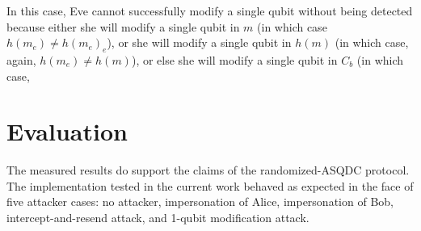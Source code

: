 \documentclass[conference]{IEEEtran}
\begin{document}
In this case, Eve cannot successfully modify a single qubit without
being detected because either she will modify a single qubit in $m$
(in which case $h\left(m_{e}\right)\neq h\left(m_{e}\right)_{e}$),
or she will modify a single qubit in $h\left(m\right)$ (in which
case, again, $h\left(m_{e}\right)\neq h\left(m\right)$), or else
she will modify a single qubit in $C_{b}$ (in which case, 

\section{Evaluation}

The measured results do support the claims of the randomized-ASQDC
protocol. The implementation tested in the current work behaved as
expected in the face of five attacker cases: no attacker, impersonation
of Alice, impersonation of Bob, intercept-and-resend attack, and 1-qubit
modification attack. 

\mydata
\end{document}
